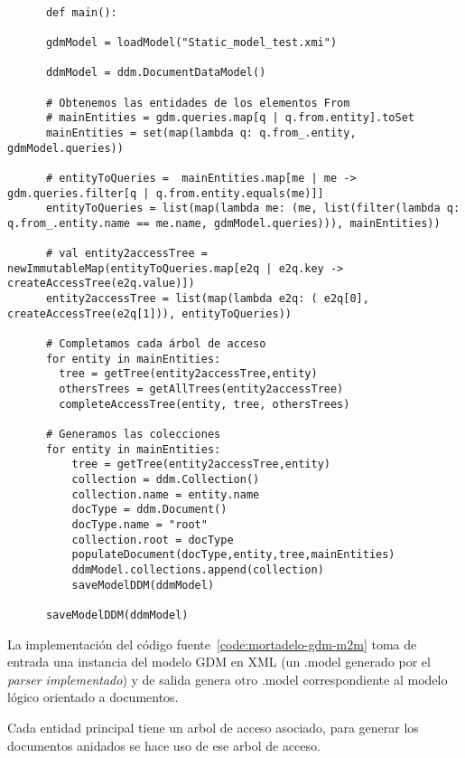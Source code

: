 \begin{code}
    \label{code:mortadelo-gdm-m2m}
    \begin{verbatim}

      def main():
    
      gdmModel = loadModel("Static_model_test.xmi")
      
      ddmModel = ddm.DocumentDataModel()
  
      # Obtenemos las entidades de los elementos From
      # mainEntities = gdm.queries.map[q | q.from.entity].toSet    
      mainEntities = set(map(lambda q: q.from_.entity, gdmModel.queries))
  
      # entityToQueries =  mainEntities.map[me | me -> gdm.queries.filter[q | q.from.entity.equals(me)]]
      entityToQueries = list(map(lambda me: (me, list(filter(lambda q: q.from_.entity.name == me.name, gdmModel.queries))), mainEntities))
          
      # val entity2accessTree = newImmutableMap(entityToQueries.map[e2q | e2q.key -> createAccessTree(e2q.value)])
      entity2accessTree = list(map(lambda e2q: ( e2q[0], createAccessTree(e2q[1])), entityToQueries))
  
      # Completamos cada árbol de acceso
      for entity in mainEntities:
        tree = getTree(entity2accessTree,entity)
        othersTrees = getAllTrees(entity2accessTree)
        completeAccessTree(entity, tree, othersTrees)
      
      # Generamos las colecciones
      for entity in mainEntities:
          tree = getTree(entity2accessTree,entity)
          collection = ddm.Collection()
          collection.name = entity.name
          docType = ddm.Document()
          docType.name = "root"
          collection.root = docType
          populateDocument(docType,entity,tree,mainEntities)
          ddmModel.collections.append(collection)
          saveModelDDM(ddmModel)
  
      saveModelDDM(ddmModel)

\end{verbatim}
\end{code}

La implementación del código fuente~\ref{code:mortadelo-gdm-m2m} toma de entrada una instancia del modelo GDM en XML (un .model generado por el \textit{parser implementado}) y de salida genera otro .model correspondiente al modelo lógico orientado a documentos.


Cada entidad principal tiene un arbol de acceso asociado, para generar los documentos anidados se hace uso de ese arbol de acceso.